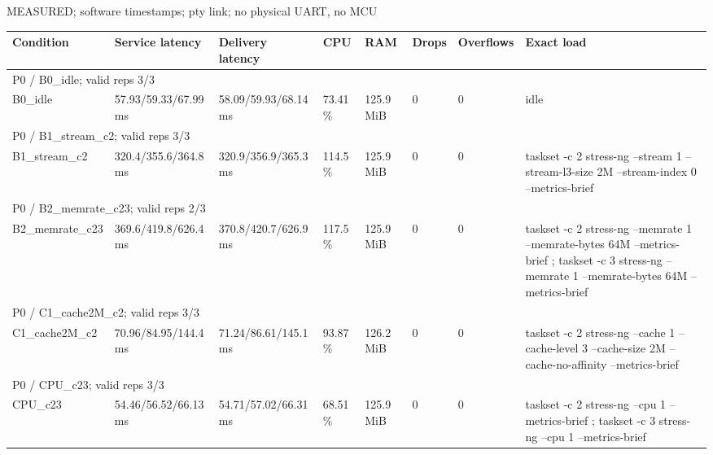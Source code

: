 \par\noindent MEASURED; software timestamps; pty link; no physical UART, no MCU\par
\begin{tabular}{llllllll}
\toprule
Condition & Service latency & Delivery latency & CPU & RAM & Drops & Overflows & Exact load \\
\midrule
\multicolumn{8}{l}{P0 / B0\_idle; valid reps 3/3} \\
B0\_idle & 57.93/59.33/67.99 ms & 58.09/59.93/68.14 ms & 73.41 \% & 125.9 MiB & 0 & 0 & idle \\
\multicolumn{8}{l}{P0 / B1\_stream\_c2; valid reps 3/3} \\
B1\_stream\_c2 & 320.4/355.6/364.8 ms & 320.9/356.9/365.3 ms & 114.5 \% & 125.9 MiB & 0 & 0 & taskset -c 2 stress-ng --stream 1 --stream-l3-size 2M --stream-index 0 --metrics-brief \\
\multicolumn{8}{l}{P0 / B2\_memrate\_c23; valid reps 2/3} \\
B2\_memrate\_c23 & 369.6/419.8/626.4 ms & 370.8/420.7/626.9 ms & 117.5 \% & 125.9 MiB & 0 & 0 & taskset -c 2 stress-ng --memrate 1 --memrate-bytes 64M --metrics-brief ; taskset -c 3 stress-ng --memrate 1 --memrate-bytes 64M --metrics-brief \\
\multicolumn{8}{l}{P0 / C1\_cache2M\_c2; valid reps 3/3} \\
C1\_cache2M\_c2 & 70.96/84.95/144.4 ms & 71.24/86.61/145.1 ms & 93.87 \% & 126.2 MiB & 0 & 0 & taskset -c 2 stress-ng --cache 1 --cache-level 3 --cache-size 2M --cache-no-affinity --metrics-brief \\
\multicolumn{8}{l}{P0 / CPU\_c23; valid reps 3/3} \\
CPU\_c23 & 54.46/56.52/66.13 ms & 54.71/57.02/66.31 ms & 68.51 \% & 125.9 MiB & 0 & 0 & taskset -c 2 stress-ng --cpu 1 --metrics-brief ; taskset -c 3 stress-ng --cpu 1 --metrics-brief \\
\bottomrule
\end{tabular}
